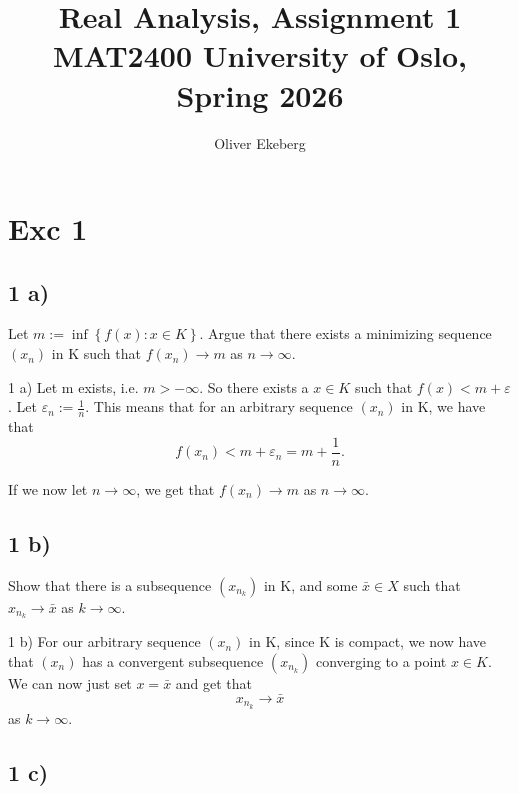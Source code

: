 \documentclass[a4paper,norsk]{article}
\title{Real Analysis, Assignment 1 \\ MAT2400 University of Oslo, Spring 2026}
\author{Oliver Ekeberg}
\renewcommand{\epsilon}{\varepsilon}
\begin{document}
\maketitle
\tableofcontents


\section*{Exc 1}

\subsection*{1 a)}


Let $ m := \inf \left\{ f(x) : x \in K \right\}  $. Argue that there exists a minimizing sequence $ \left( x_n \right)  $ in K such that $ f(x_n) \to m $ as $ n \to \infty $. 

\begin{proofbox}{1 a)}{}
    Let m exists, i.e. $ m > - \infty $. So there exists a $ x \in K $ such that $ f(x) < m + \epsilon  $. Let $ \epsilon_n := \frac{ 1 }{ n } $. This means that for an arbitrary sequence $ \left( x_n \right)  $ in K, we have that
    \[
        f(x_n)  < m + \epsilon_n = m + \frac{ 1 }{ n }.
    \]
    

    If we now let $ n \to \infty $, we get that $ f(x_n) \to m $ as $ n \to \infty $. 
    
\end{proofbox}

\subsection*{1 b)}
Show that there is a subsequence $ \left( x_{n_k} \right)  $ in K, and some $ \bar{x} \in  X $ such that $ x_{n_k} \to \bar{x} $ as $ k \to \infty $.  
\begin{proofbox}{1 b)}{}
    For our arbitrary sequence $ \left( x_n \right)  $ in K, since K is compact, we now have that $ \left( x_n \right)  $ has a convergent subsequence $ \left( x_{n_k} \right)  $ converging to a point $ x \in K $. We can now just set $ x = \bar{x} $ and get that 
    \[
        x_{n_k} \to \bar{x}
    \]
    as $ k \to \infty $.
\end{proofbox}


\subsection*{1 c)}
\end{document}
